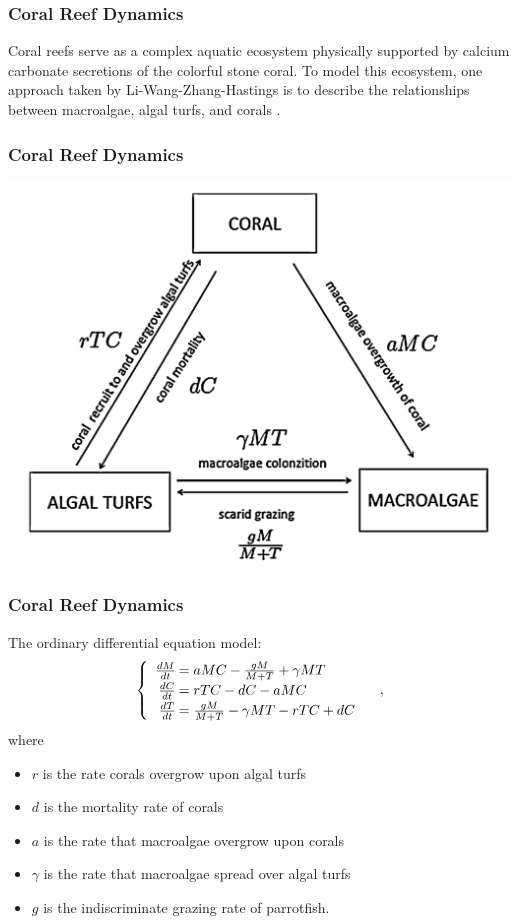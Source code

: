 

\begin{frame}
\frametitle{Coral Reef Dynamics}
\hspace{1.5em}Coral reefs serve as a complex aquatic ecosystem physically supported by calcium carbonate secretions of the colorful stone coral. To model this ecosystem, one approach taken by Li-Wang-Zhang-Hastings is to describe the relationships between macroalgae, algal turfs, and corals \cite{Hastings}.
\end{frame}

\begin{frame}
\frametitle{Coral Reef Dynamics}
\includegraphics[scale=.35]{./coral-reef-triangle.png}
\end{frame}

\begin{frame}\frametitle{Coral Reef Dynamics}
The ordinary differential equation model:
$$\begin{cases}\begin{array}{rl}
\frac{dM}{dt}\hspace{-.8em}&=aMC - \frac{gM}{M+T} + \gamma M T\\
\frac{dC}{dt}\hspace{-.8em}&=rTC - dC - aMC\\
\frac{dT}{dt}\hspace{-.8em}&=\frac{gM}{M + T} - \gamma MT - rTC + dC
\end{array}\end{cases},$$ where \begin{itemize}\itemsep0pt
\item $r$ is the rate corals overgrow upon algal turfs\\
\item $d$ is the mortality rate of corals\\
\item $a$ is the rate that macroalgae overgrow upon corals\\
\item $\gamma$ is the rate that macroalgae spread over algal turfs\\
\item $g$ is the indiscriminate grazing rate of parrotfish.
\end{itemize}
\end{frame}

